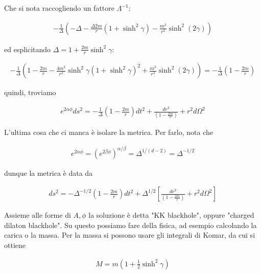 \documentclass{report}
\begin{document}
Che si nota raccogliendo un fattore \(\Lambda^{-1}\): 

\begin{align}
    -\frac{1}{\Delta}\left(-\Delta - \frac{\Delta 2m}{r}(1+\sinh^2\gamma) - \frac{m^2}{r^2}\sinh^2(2\gamma) \right)
\end{align}

ed esplicitando \(\Delta = 1 + \frac{2m}{r}\sinh^2 \gamma\): 

\begin{align}
    -\frac{1}{\Delta}\left(1 - \frac{2m}{r} - \frac{4m^2}{r^2}\sinh^2\gamma(1+\sinh^2\gamma)^2 + \frac{m^2}{r^2}\sinh^2(2\gamma)\right) = -\frac{1}{\Delta}\left(1-\frac{2m}{r} \right)
\end{align}

quindi, troviamo 

\begin{align}
    e^{2\alpha\phi}ds^2 = -\frac{1}{\Delta}\left(1-\frac{2m}{r} \right)dt^2 + \frac{dr^2}{\left(1-\frac{2m}{r} \right)} + r^2d\Omega^2
\end{align}

L'ultima cosa che ci manca è isolare la metrica. Per farlo, nota che 

\begin{align}
    e^{2\alpha\phi} = (e^{2\beta\phi})^{\alpha/\beta} = \Delta^{1/(d-2)} = \Delta^{-1/2}
\end{align}

dunque la metrica è data da 

\begin{align}
    ds^2 = -\Delta^{-1/2}\left(1-\frac{2m}{r} \right)dt^2 + \Delta^{1/2}\left[\frac{dr^2}{\left(1-\frac{2m}{r} \right)} +r^2d\Omega^2\right]
\end{align}

Assieme alle forme di \(A, \phi\) la soluzione è detta "KK blackhole", oppure "charged dilaton blackhole". Su questo possiamo fare della fisica, ad esempio calcolando la carica o la massa. Per la massa si possono usare gli integrali di Komar, da cui si ottiene 

\begin{align}
    M = m\left(1 + \frac{1}{2}\sinh^2\gamma \right)
\end{align}
\end{document}
